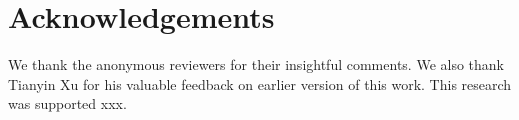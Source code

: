 
\section*{Acknowledgements}

We thank the anonymous reviewers for their insightful comments.
We also thank Tianyin Xu for his valuable feedback
on earlier version of this work.
This research was supported xxx.
